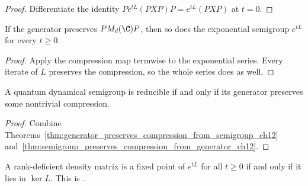 \begin{proof}
    \leanok
    Differentiate the identity $P e^{tL}(PXP) P = e^{tL}(PXP)$ at $t=0$.
\end{proof}

\begin{theorem}
    \label{thm:semigroup_preserves_compression_from_generator_ch12}
    \leanok
    If the generator preserves $P M_d(\C) P$, then so does the exponential semigroup
    $e^{tL}$ for every $t \ge 0$.
\end{theorem}

\begin{proof}
    \leanok
    Apply the compression map termwise to the exponential series. Every iterate of $L$
    preserves the compression, so the whole series does as well.
\end{proof}

\begin{theorem}
    \label{thm:isReducibleQDS_iff_generator_preserves_compression_ch12}
    \leanok
    A quantum dynamical semigroup is reducible if and only if its generator preserves some
    nontrivial compression.
\end{theorem}

\begin{proof}
    \leanok
    Combine Theorems~\ref{thm:generator_preserves_compression_from_semigroup_ch12}
    and~\ref{thm:semigroup_preserves_compression_from_generator_ch12}.
\end{proof}

\begin{theorem}
    \label{thm:wolf_prop_7_6_one_iff_two}
    \leanok
    A rank-deficient density matrix is a fixed point of $e^{tL}$ for all
    $t \ge 0$ if and only if it lies in $\ker L$.
    This is \cite[Proposition~7.6, (1)$\Leftrightarrow$(2)]{Wolf2012Quantum}.
\end{theorem}

